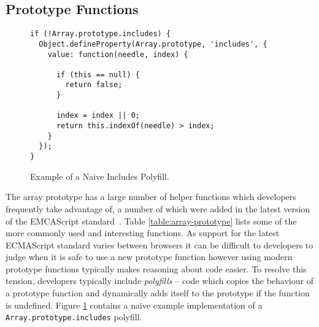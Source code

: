 \documentclass[]{final_report}
\begin{document}
\subsection{Prototype Functions} \label{sec:array-prototype-functions}

\begin{figure}[t]
\begin{lstlisting}
if (!Array.prototype.includes) {
  Object.defineProperty(Array.prototype, 'includes', {
    value: function(needle, index) {

      if (this == null) {
        return false;
      }

      index = index || 0;
      return this.indexOf(needle) > index;
    }
  });
}
\end{lstlisting}
\caption{\label{fig:naive-includes-polyfill} Example of a Naive Includes Polyfill.}
\end{figure}

The array prototype has a large number of helper functions which developers frequently take advantage of, a number of which were added in the latest version of the EMCAScript standard~\cite{EcmaScript}. Table \ref{table:array-prototype} lists some of the more commonly used and interesting functions. As support for the latest ECMAScript standard varies between browsers it can be difficult to developers to judge when it is safe to use a new prototype function however using modern prototype functions typically makes reasoning about code easier. To resolve this tension, developers typically include \textit{polyfills} -- code which copies the behaviour of a prototype function and dynamically adds itself to the prototype if the function is undefined. Figure \ref{fig:naive-includes-polyfill} contains a naive example implementation of a \lstinline|Array.prototype.includes| polyfill.
\end{document}
